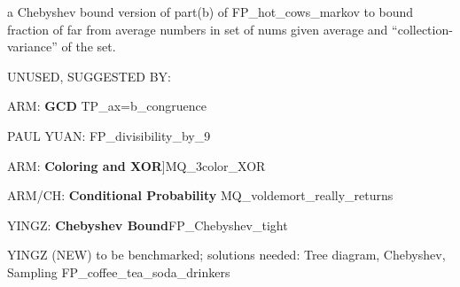 \documentclass[quiz]{mcs}
\renewcommand{\examspace}[]{}
\begin{document}
\examspace
{}

\examspace
\begin{editingnotes}
 a Chebyshev bound version of part(b) of
FP\_hot\_cows\_markov to bound fraction of far from average numbers in
set of nums given average and ``collection-variance'' of the set.
\end{editingnotes}

\begin{editingnotes}
UNUSED, SUGGESTED BY:

ARM: \textbf{GCD} TP\_ax=b\_congruence

PAUL YUAN: FP\_divisibility\_by\_9

ARM: \textbf{Coloring and XOR}]MQ\_3color\_XOR

ARM/CH: \textbf{Conditional Probability} MQ\_voldemort\_really\_returns

YINGZ: \textbf{Chebyshev Bound}FP\_Chebyshev\_tight

YINGZ (NEW) to be benchmarked; solutions needed: Tree diagram,
Chebyshev, Sampling FP\_coffee\_tea\_soda\_drinkers
\end{editingnotes}

\end{document}
